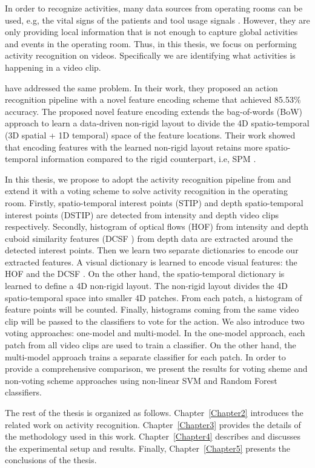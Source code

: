 In order to recognize activities, many data sources from operating rooms can be used, e.g, the vital signs of the patients \cite{Bhatia:2007:RIO:1620113.1620126} and tool usage signals \cite{Padoy2012632}. However, they are only providing local information that is not enough to capture global activities and events in the operating room. Thus, in this thesis, we focus on performing activity recognition on videos. Specifically we are identifying what activities is happening in a video clip.

\citet{twinanda2015data} have addressed the same problem. In their work, they proposed an action recognition pipeline with a novel feature encoding scheme that achieved 85.53\% accuracy. The proposed novel feature encoding extends the bag-of-words (BoW) approach to learn a data-driven non-rigid layout to divide the 4D spatio-temporal (3D spatial + 1D temporal) space of the feature locations. Their work showed that encoding features with the learned non-rigid layout retains more spatio-temporal information compared to the rigid counterpart, i.e, SPM \cite{1641019}. 

In this thesis, we propose to adopt the activity recognition pipeline from \cite{twinanda2015data} and extend it with a voting scheme to solve activity recognition in the operating room. Firstly, spatio-temporal interest points (STIP) and depth spatio-temporal interest points (DSTIP) are detected from intensity and depth video clips respectively. Secondly, histogram of optical flows (HOF) from intensity and depth cuboid similarity features (DCSF \cite{6619209}) from depth data are extracted around the detected interest points. Then we learn two separate dictionaries to encode our extracted features. A visual dictionary is learned to encode visual features: the HOF and the DCSF \cite{6619209}. On the other hand, the spatio-temporal dictionary is learned to define a 4D non-rigid layout. The non-rigid layout divides the 4D spatio-temporal space into smaller 4D patches. From each patch, a histogram of feature points will be counted. Finally, histograms coming from the same video clip will be passed to the classifiers to vote for the action. We also introduce two voting approaches: one-model and multi-model. In the one-model approach, each patch from all video clips are used to train a classifier. On the other hand, the multi-model approach trains a separate classifier for each patch. In order to provide a comprehensive comparison, we present the results for voting sheme and non-voting scheme approaches using non-linear SVM and Random Forest classifiers.

The rest of the thesis is organized as follows. Chapter~\ref{Chapter2} introduces the related work on activity recognition. Chapter~\ref{Chapter3} provides the details of the methodology used in this work. Chapter~\ref{Chapter4} describes and discusses the experimental setup and results. Finally, Chapter~\ref{Chapter5} presents the conclusions of the thesis. 



